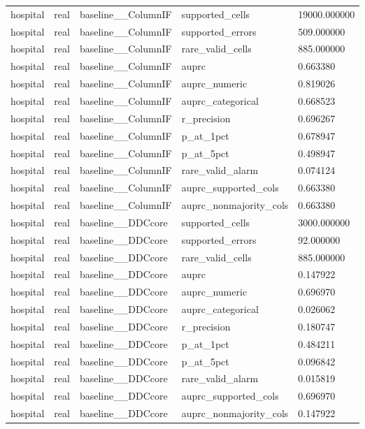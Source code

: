 \begin{tabular}{lllll}
hospital & real & baseline\_\_ColumnIF & supported\_cells & 19000.000000 \\
hospital & real & baseline\_\_ColumnIF & supported\_errors & 509.000000 \\
hospital & real & baseline\_\_ColumnIF & rare\_valid\_cells & 885.000000 \\
hospital & real & baseline\_\_ColumnIF & auprc & 0.663380 \\
hospital & real & baseline\_\_ColumnIF & auprc\_numeric & 0.819026 \\
hospital & real & baseline\_\_ColumnIF & auprc\_categorical & 0.668523 \\
hospital & real & baseline\_\_ColumnIF & r\_precision & 0.696267 \\
hospital & real & baseline\_\_ColumnIF & p\_at\_1pct & 0.678947 \\
hospital & real & baseline\_\_ColumnIF & p\_at\_5pct & 0.498947 \\
hospital & real & baseline\_\_ColumnIF & rare\_valid\_alarm & 0.074124 \\
hospital & real & baseline\_\_ColumnIF & auprc\_supported\_cols & 0.663380 \\
hospital & real & baseline\_\_ColumnIF & auprc\_nonmajority\_cols & 0.663380 \\
hospital & real & baseline\_\_DDCcore & supported\_cells & 3000.000000 \\
hospital & real & baseline\_\_DDCcore & supported\_errors & 92.000000 \\
hospital & real & baseline\_\_DDCcore & rare\_valid\_cells & 885.000000 \\
hospital & real & baseline\_\_DDCcore & auprc & 0.147922 \\
hospital & real & baseline\_\_DDCcore & auprc\_numeric & 0.696970 \\
hospital & real & baseline\_\_DDCcore & auprc\_categorical & 0.026062 \\
hospital & real & baseline\_\_DDCcore & r\_precision & 0.180747 \\
hospital & real & baseline\_\_DDCcore & p\_at\_1pct & 0.484211 \\
hospital & real & baseline\_\_DDCcore & p\_at\_5pct & 0.096842 \\
hospital & real & baseline\_\_DDCcore & rare\_valid\_alarm & 0.015819 \\
hospital & real & baseline\_\_DDCcore & auprc\_supported\_cols & 0.696970 \\
hospital & real & baseline\_\_DDCcore & auprc\_nonmajority\_cols & 0.147922 \\

\end{tabular}
